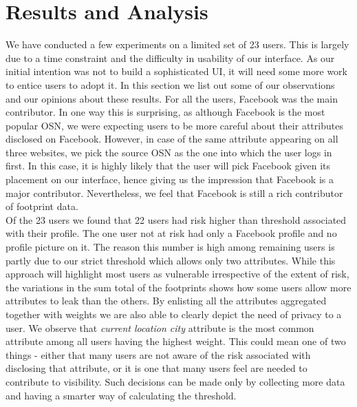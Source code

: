 \documentclass[10pt,conference]{IEEEtran}
\begin{document}
\section{Results and Analysis}
We have conducted a few experiments on a limited set of 23 users. This is largely due to a time constraint and the difficulty in usability of our interface. As our initial intention was not to build a sophisticated UI, it will need some more work to entice users to adopt it. In this section we list out some of our observations and our opinions about these results. For all the users, Facebook was the main contributor. In one way this is surprising, as although Facebook is the most popular OSN, we were expecting users to be more careful about their attributes disclosed on Facebook. However, in case of the same attribute appearing on all three websites, we pick the source OSN as the one into which the user logs in first. In this case, it is highly likely that the user will pick Facebook given its placement on our interface, hence giving us the impression that Facebook is a major contributor. Nevertheless, we feel that Facebook is still a rich contributor of footprint data. \\

Of the 23 users we found that 22 users had risk higher than threshold associated with their profile. The one user not at risk had only a Facebook profile and no profile picture on it. The reason this number is high among remaining users is partly due to our strict threshold which allows only two attributes. While this approach will highlight most users as vulnerable irrespective of the extent of risk, the variations in the sum total of the footprints shows how some users allow more attributes to leak than the others. By enlisting all the attributes aggregated together with weights we are also able to clearly depict the need of privacy to a user. We observe that \textit{current location city} attribute is the most common attribute among all users having the highest weight. This could mean one of two things - either that many users are not aware of the risk associated with disclosing that attribute, or it is one that many users feel are needed to contribute to visibility. Such decisions can be made only by collecting more data and having a smarter way of calculating the threshold.\\
\end{document}
